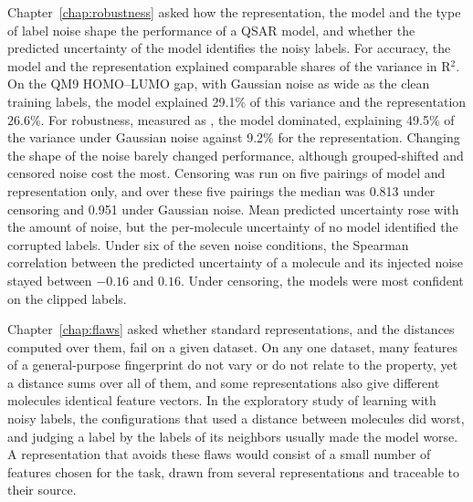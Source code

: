 Chapter~\ref{chap:robustness} asked how the representation, the model and the type of label noise shape the performance of a QSAR model, and whether the predicted uncertainty of the model identifies the noisy labels. For accuracy, the model and the representation explained comparable shares of the variance in R$^2$. On the QM9 HOMO--LUMO gap, with Gaussian noise as wide as the clean training labels, the model explained 29.1\% of this variance and the representation 26.6\%. For robustness, measured as \aucnorm, the model dominated, explaining 49.5\% of the variance under Gaussian noise against 9.2\% for the representation. Changing the shape of the noise barely changed performance, although grouped-shifted and censored noise cost the most. Censoring was run on five pairings of model and representation only, and over these five pairings the median \aucnorm{} was 0.813 under censoring and 0.951 under Gaussian noise. Mean predicted uncertainty rose with the amount of noise, but the per-molecule uncertainty of no model identified the corrupted labels. Under six of the seven noise conditions, the Spearman correlation between the predicted uncertainty of a molecule and its injected noise stayed between $-0.16$ and $0.16$. Under censoring, the models were most confident on the clipped labels.

Chapter~\ref{chap:flaws} asked whether standard representations, and the distances computed over them, fail on a given dataset. On any one dataset, many features of a general-purpose fingerprint do not vary or do not relate to the property, yet a distance sums over all of them, and some representations also give different molecules identical feature vectors. In the exploratory study of learning with noisy labels, the configurations that used a distance between molecules did worst, and judging a label by the labels of its neighbors usually made the model worse. A representation that avoids these flaws would consist of a small number of features chosen for the task, drawn from several representations and traceable to their source.

